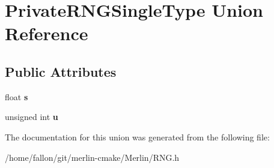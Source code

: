 \hypertarget{unionPrivateRNGSingleType}{}\section{Private\+R\+N\+G\+Single\+Type Union Reference}
\label{unionPrivateRNGSingleType}
\subsection*{Public Attributes}
\begin{DoxyCompactItemize}
\item 
\mbox{\label{unionPrivateRNGSingleType_af4af92bd0d391cdfac78953b49d390b7}} 
float {\bfseries s}
\item 
\mbox{\label{unionPrivateRNGSingleType_ab60822610ee8d793266f78ee397052a7}} 
unsigned int {\bfseries u}
\end{DoxyCompactItemize}


The documentation for this union was generated from the following file\+:\begin{DoxyCompactItemize}
\item 
/home/fallon/git/merlin-\/cmake/\+Merlin/R\+N\+G.\+h\end{DoxyCompactItemize}

